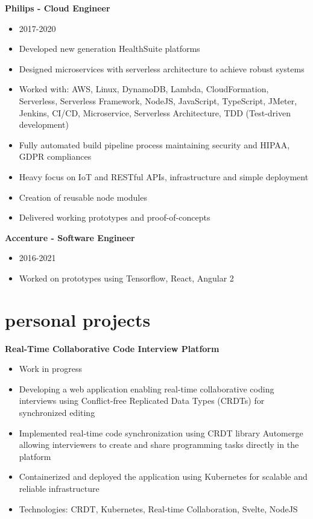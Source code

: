 \documentclass[]{friggeri-cv}
\begin{document}
\textbf{Philips - Cloud Engineer}
\begin{itemize}
  \item 2017-2020
  \item Developed new generation HealthSuite platforms
  \item Designed microservices with serverless architecture to achieve robust systems
  \item Worked with: AWS, Linux, DynamoDB, Lambda, CloudFormation, Serverless, Serverless Framework, NodeJS, JavaScript, TypeScript, JMeter, Jenkins, CI/CD, Microservice, Serverless Architecture, TDD (Test-driven development)
  \item Fully automated build pipeline process maintaining security and HIPAA, GDPR compliances
  \item Heavy focus on IoT and RESTful APIs, infrastructure and simple deployment
  \item Creation of reusable node modules
  \item Delivered working prototypes and proof-of-concepts
\end{itemize}

\textbf{Accenture - Software Engineer}
\begin{itemize}
  \item 2016-2021
  \item Worked on prototypes using Tensorflow, React, Angular 2
\end{itemize}

\section{personal projects}

\textbf{Real-Time Collaborative Code Interview Platform}
\begin{itemize}
  \item Work in progress
  \item Developing a web application enabling real-time collaborative coding interviews using Conflict-free Replicated Data Types (CRDTs) for synchronized editing
  \item Implemented real-time code synchronization using CRDT library Automerge allowing interviewers to create and share programming tasks directly in the platform
  \item Containerized and deployed the application using Kubernetes for scalable and reliable infrastructure
  \item Technologies: CRDT, Kubernetes, Real-time Collaboration, Svelte, NodeJS
\end{itemize}
\end{document}
